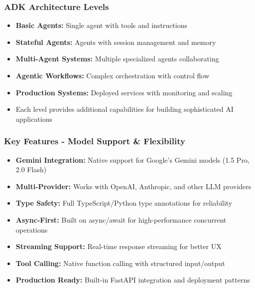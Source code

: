 \begin{frame}[fragile]\frametitle{ADK Architecture Levels}
      \begin{itemize}
	\item \textbf{Basic Agents:} Single agent with tools and instructions
	\item \textbf{Stateful Agents:} Agents with session management and memory
	\item \textbf{Multi-Agent Systems:} Multiple specialized agents collaborating
	\item \textbf{Agentic Workflows:} Complex orchestration with control flow
	\item \textbf{Production Systems:} Deployed services with monitoring and scaling
	\item Each level provides additional capabilities for building sophisticated AI applications
	  \end{itemize}
\end{frame}

\begin{frame}[fragile]\frametitle{Key Features - Model Support \& Flexibility}
      \begin{itemize}
	\item \textbf{Gemini Integration:} Native support for Google's Gemini models (1.5 Pro, 2.0 Flash)
	\item \textbf{Multi-Provider:} Works with OpenAI, Anthropic, and other LLM providers
	\item \textbf{Type Safety:} Full TypeScript/Python type annotations for reliability
	\item \textbf{Async-First:} Built on async/await for high-performance concurrent operations
	\item \textbf{Streaming Support:} Real-time response streaming for better UX
	\item \textbf{Tool Calling:} Native function calling with structured input/output
	\item \textbf{Production Ready:} Built-in FastAPI integration and deployment patterns
	  \end{itemize}
\end{frame}

